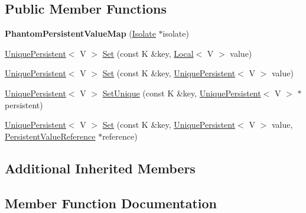 \subsection*{Public Member Functions}
\begin{DoxyCompactItemize}
\item 
\hypertarget{classv8_1_1_phantom_persistent_value_map_abb19ea5653c40bdf1409b2a12d6fda18}{}{\bfseries Phantom\+Persistent\+Value\+Map} (\hyperlink{classv8_1_1_isolate}{Isolate} $\ast$isolate)\label{classv8_1_1_phantom_persistent_value_map_abb19ea5653c40bdf1409b2a12d6fda18}

\item 
\hyperlink{classv8_1_1_unique_persistent}{Unique\+Persistent}$<$ V $>$ \hyperlink{classv8_1_1_phantom_persistent_value_map_aa17ffd5cc7bbf363146fc8af55f9c652}{Set} (const K \&key, \hyperlink{classv8_1_1_local}{Local}$<$ V $>$ value)
\item 
\hyperlink{classv8_1_1_unique_persistent}{Unique\+Persistent}$<$ V $>$ \hyperlink{classv8_1_1_phantom_persistent_value_map_afdec04ae72bb3322fd41d0d94fac8ed6}{Set} (const K \&key, \hyperlink{classv8_1_1_unique_persistent}{Unique\+Persistent}$<$ V $>$ value)
\item 
\hyperlink{classv8_1_1_unique_persistent}{Unique\+Persistent}$<$ V $>$ \hyperlink{classv8_1_1_phantom_persistent_value_map_a71befa11bba57788a7a407a61fe0647c}{Set\+Unique} (const K \&key, \hyperlink{classv8_1_1_unique_persistent}{Unique\+Persistent}$<$ V $>$ $\ast$persistent)
\item 
\hyperlink{classv8_1_1_unique_persistent}{Unique\+Persistent}$<$ V $>$ \hyperlink{classv8_1_1_phantom_persistent_value_map_ad17a6ec3013e932005f06fed99a95d2c}{Set} (const K \&key, \hyperlink{classv8_1_1_unique_persistent}{Unique\+Persistent}$<$ V $>$ value, \hyperlink{classv8_1_1_persistent_value_map_base_1_1_persistent_value_reference}{Persistent\+Value\+Reference} $\ast$reference)
\end{DoxyCompactItemize}
\subsection*{Additional Inherited Members}


\subsection{Member Function Documentation}
\hypertarget{classv8_1_1_phantom_persistent_value_map_aa17ffd5cc7bbf363146fc8af55f9c652}{}
